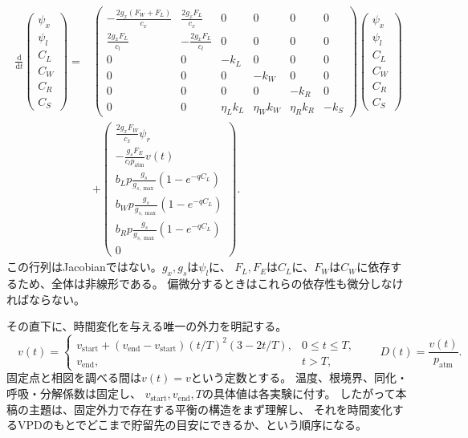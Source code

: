 \documentclass[a4paper,11pt]{ltjsarticle}
\newcommand{\dd}{\mathrm{d}}
\begin{document}
\begin{equation}\label{eq:sixmatrix}
\begin{aligned}
\frac{\dd}{\dd t}
\begin{pmatrix}\psi_x\\\psi_l\\C_L\\C_W\\C_R\\C_S\end{pmatrix}
={}&
\begin{pmatrix}
-\frac{2g_x(F_W+F_L)}{c_x}&\frac{2g_xF_L}{c_x}&0&0&0&0\\
\frac{2g_xF_L}{c_l}&-\frac{2g_xF_L}{c_l}&0&0&0&0\\
0&0&-k_L&0&0&0\\
0&0&0&-k_W&0&0\\
0&0&0&0&-k_R&0\\
0&0&\eta_Lk_L&\eta_Wk_W&\eta_Rk_R&-k_S
\end{pmatrix}
\begin{pmatrix}\psi_x\\\psi_l\\C_L\\C_W\\C_R\\C_S\end{pmatrix}\\
&+\begin{pmatrix}
\frac{2g_xF_W}{c_x}\psi_r\\
-\frac{g_sF_E}{c_lp_{\mathrm{atm}}}v(t)\\
b_Lp\frac{g_s}{g_{s,\max}}(1-e^{-qC_L})\\
b_Wp\frac{g_s}{g_{s,\max}}(1-e^{-qC_L})\\
b_Rp\frac{g_s}{g_{s,\max}}(1-e^{-qC_L})\\
0
\end{pmatrix}.
\end{aligned}
\end{equation}
この行列はJacobianではない。$g_x,g_s$は$\psi_l$に、
$F_L,F_E$は$C_L$に、$F_W$は$C_W$に依存するため、全体は非線形である。
偏微分するときはこれらの依存性も微分しなければならない。

その直下に、時間変化を与える唯一の外力を明記する。
\begin{equation}\label{eq:forcingexplicit}
\boxed{\quad
v(t)=
\begin{cases}
v_{\mathrm{start}}+(v_{\mathrm{end}}-v_{\mathrm{start}})
       (t/T)^2(3-2t/T),&0\le t\le T,\\
v_{\mathrm{end}},&t>T,
\end{cases}
\qquad D(t)=\frac{v(t)}{p_{\mathrm{atm}}}.\quad}
\end{equation}
固定点と相図を調べる間は$v(t)=v$という定数とする。
温度、根境界、同化・呼吸・分解係数は固定し、
$v_{\mathrm{start}},v_{\mathrm{end}},T$の具体値は各実験に付す。
したがって本稿の主題は、固定外力で存在する平衡の構造をまず理解し、
それを時間変化するVPDのもとでどこまで貯留先の目安にできるか、という順序になる。
\end{document}
